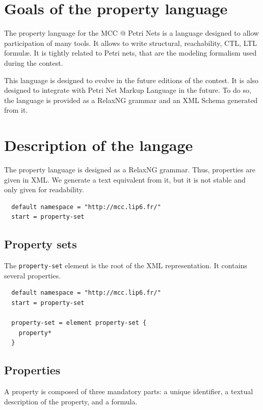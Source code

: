 \documentclass[10pt,english,a4paper]{article}
\newcommand{\mcc}[0]{MCC}
\begin{document}
\color{defaultcolor}

\section*{Goals of the property language}
The property language for the \mcc{} @ Petri Nets is a language designed to allow
participation of many tools.
It allows to write structural, reachability, CTL, LTL formul{\ae}.
It is tightly related to Petri nets, that are the modeling formalism used during the contest.

This language is designed to evolve in the future editions of the contest.
It is also designed to integrate with Petri Net Markup Language in the future.
To do so, the language is provided as a RelaxNG grammar and an XML Schema generated from it.

\tableofcontents

\section{Description of the langage}
The property language is designed as a RelaxNG grammar. Thus, properties are given in XML.
We generate a text equivalent from it, but it is not stable and only given for readability.

\begin{lstlisting}
  default namespace = "http://mcc.lip6.fr/"
  start = property-set
\end{lstlisting}
\subsection{Property sets}
The \lstinline[language=xsd]!property-set! element is the root of the XML representation.
It contains several properties.
\begin{lstlisting}
  default namespace = "http://mcc.lip6.fr/"
  start = property-set

  property-set = element property-set {
    property*
  }
\end{lstlisting}

\subsection{Properties}
A property is composed of three mandatory parts: a unique identifier, a textual description
of the property, and a formula.
\end{document}
